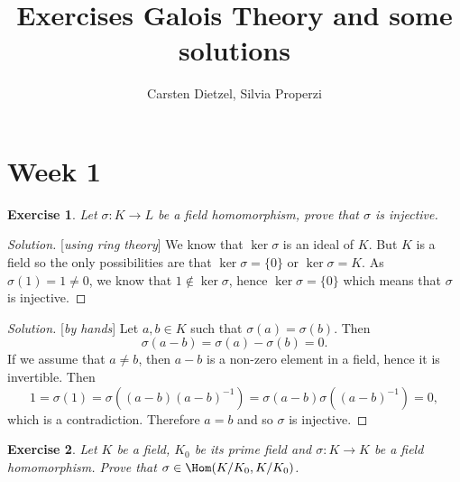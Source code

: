 \documentclass[a4paper,10pt,reqno]{amsart}
\title{Exercises Galois Theory and some solutions}
\author{Carsten Dietzel, Silvia Properzi}
\newtheorem{ex}{Exercise}[section]
\newenvironment{sol}
  {\renewcommand\qedsymbol{$\blacksquare$}\begin{proof}[Solution]}
  {\end{proof}}
\begin{document}
\maketitle
\section{Week 1}


\begin{ex}
\label{1.1}
    Let $\sigma : K\to L$ be a field homomorphism, prove that $\sigma$ is injective.
\end{ex}
\begin{sol}[\textit{using ring theory}]
    We know that $\ker\sigma$ is an ideal of $K$.
    But $K$ is a field so the only possibilities are that $\ker\sigma=\{0\}$ or $\ker\sigma=K$.
    As $\sigma(1)=1\neq 0$, we know that $1\not\in \ker\sigma$, hence $\ker\sigma=\{0\}$ which means that $\sigma$ is injective.
\end{sol}
\begin{sol}[\textit{by hands}]
    Let $a,b\in K$ such that $\sigma(a)=\sigma(b)$.
    Then 
    \[
    \sigma(a-b)=\sigma(a)-\sigma(b)=0.
    \]
    If we assume that $a\neq b$, then $a-b$ is a non-zero element in a field, hence it is invertible.
    Then 
    \[
    1=\sigma(1)=\sigma((a-b)(a-b)^{-1})=
    \sigma(a-b)\sigma((a-b)^{-1})=0,
    \]
    which is a contradiction.
    Therefore $a=b$ and so $\sigma$ is injective.
\end{sol}

\begin{ex}
\label{1.2}
    Let $K$ be a field, $K_0$ be its prime field and $\sigma:K\to K$ be a field homomorphism. Prove that $\sigma\in\Hom(K/K_0,K/K_0)$.
\end{ex}
\end{document}
